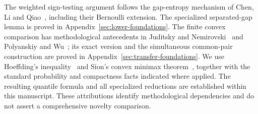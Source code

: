 The weighted sign-testing argument follows the gap-entropy
mechanism of Chen, Li and Qiao~\cite{clq}, including their
Bernoulli extension. The specialized separated-gap lemma is
proved in Appendix~\ref{sec:lower-foundations}. The finite
convex comparison has methodological antecedents in
Juditsky and Nemirovski~\cite{jn} and Polyanskiy and Wu~\cite{pw};
its exact version and the simultaneous common-pair construction
are proved in Appendix~\ref{sec:transfer-foundations}.
We use Hoeffding's inequality~\cite{hoeffding} and Sion's convex
minimax theorem~\cite{sion}, together with the standard probability
and compactness facts indicated where applied. The resulting
quantile formula and all specialized reductions are established
within this manuscript. These attributions identify methodological
dependencies and do not assert a comprehensive novelty comparison.


